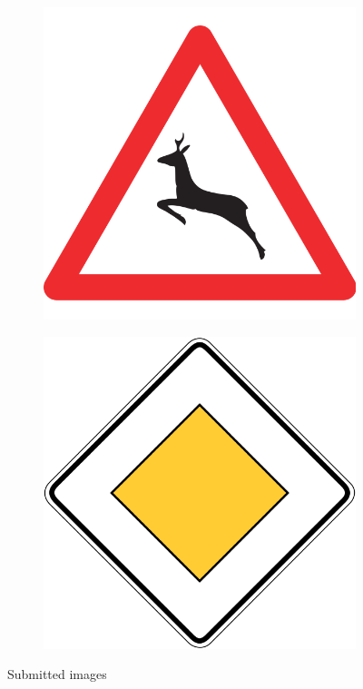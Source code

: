 \begin{figure}[!h]
\begin{subfigure}{.19\linewidth}
\end{subfigure}
\begin{subfigure}{.19\linewidth}
  \centering
  \includegraphics[width=0.7\linewidth]{imgs/16_real}
\end{subfigure}
\begin{subfigure}{.19\linewidth}
  \centering
  \includegraphics[width=0.7\linewidth]{imgs/20_real}
\end{subfigure}
\caption{Submitted images}
\label{fig:submitted}
\end{figure}

